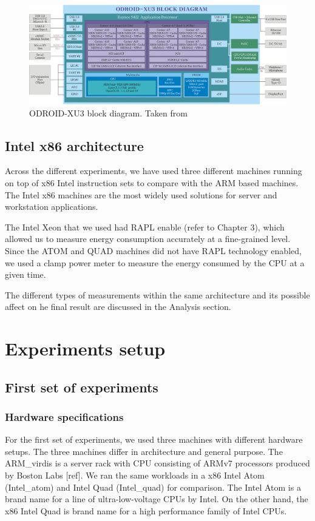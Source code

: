 \begin{figure}[h!]
  \centering
    \includegraphics[width=\textwidth]{"img/odroidxu3-diagram"}
    \caption{ODROID-XU3 block diagram. Taken from \cite{ODROID_XU3}}
    \label{fig:odroidxu3-diagram}
\end{figure}


\subsection{Intel x86 architecture}

Across the different experiments, we have used three different machines running
on top of x86 Intel instruction sets to
compare with the ARM based machines. The Intel x86 machines are the most widely
used solutions for server and workstation applications.

The Intel Xeon that we used had RAPL enable (refer to Chapter 3), which allowed us to measure energy
consumption accurately at a fine-grained level. Since the ATOM and QUAD machines
did not have RAPL technology enabled, we used a clamp power meter to measure the
energy consumed by the CPU at a given time.

The different types of measurements within the same architecture and
its possible affect on he final result are discussed in the Analysis section.

\clearpage


\section{Experiments setup}
\subsection{First set of experiments}

\subsubsection*{Hardware specifications}
For the first set of experiments, we used three machines with different hardware setups. The three machines differ in architecture and general purpose. The ARM\_virdis is a server rack with CPU consisting of ARMv7 processors produced by Boston Labs [ref]. We ran the same workloads in a x86 Intel Atom (Intel\_atom) and Intel Quad (Intel\_quad) for comparison. The Intel Atom is a brand name for a line of ultra-low-voltage CPUs by Intel. On the other hand, the x86 Intel Quad is brand name for a high performance family of Intel CPUs.

